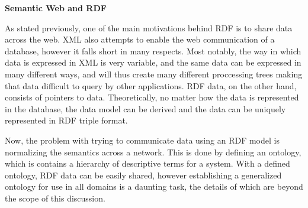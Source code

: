 
\par
\textbf{Semantic Web and RDF}
\par
As stated previously, one of the main motivations behind RDF is to share data across the web. XML also attempts to enable the web communication of a database, however it falls short in many respects. Most notably, the way in which data is expressed in XML is very variable, and the same data can be expressed in many different ways, and will thus create many different proccessing trees making that data difficult to query by other applications\cite{semantic}. RDF data, on the other hand, consists of pointers to data. Theoretically, no matter how the data is represented in the database, the data model can be derived and the data can be uniquely represented in RDF triple format.


Now, the problem with trying to communicate data using an RDF model is normalizing the semantics across a network. This is done by defining an ontology, which is contains a hierarchy of descriptive terms for a system\cite{semantic}. With a defined ontology, RDF data can be easily shared, however establishing a generalized ontology for use in all domains is a daunting task, the details of which are beyond the scope of this discussion.

